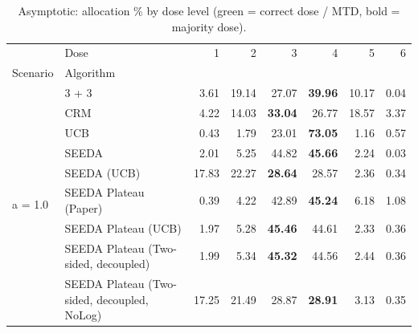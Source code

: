 \begin{table}[H]
\centering
\caption{Asymptotic: allocation \% by dose level (green = correct dose / MTD, bold = majority dose).}
\label{tab:asym_alloc_by_dose}
\begin{tabular}{llrrrrrr}
\toprule
 & Dose & 1 & 2 & 3 & 4 & 5 & 6 \\
Scenario & Algorithm &  &  &  &  &  &  \\
\midrule
\multirow[c]{9}{*}{a = 1.0} & 3 + 3 & 3.61 & 19.14 & {\cellcolor[HTML]{C8E6C9}} 27.07 & \bfseries 39.96 & 10.17 & 0.04 \\
 & CRM & 4.22 & 14.03 & {\cellcolor[HTML]{C8E6C9}} \bfseries 33.04 & 26.77 & 18.57 & 3.37 \\
 & UCB & 0.43 & 1.79 & {\cellcolor[HTML]{C8E6C9}} 23.01 & \bfseries 73.05 & 1.16 & 0.57 \\
 & SEEDA & 2.01 & 5.25 & {\cellcolor[HTML]{C8E6C9}} 44.82 & \bfseries 45.66 & 2.24 & 0.03 \\
 & SEEDA (UCB) & 17.83 & 22.27 & {\cellcolor[HTML]{C8E6C9}} \bfseries 28.64 & 28.57 & 2.36 & 0.34 \\
 & SEEDA Plateau (Paper) & 0.39 & 4.22 & {\cellcolor[HTML]{C8E6C9}} 42.89 & \bfseries 45.24 & 6.18 & 1.08 \\
 & SEEDA Plateau (UCB) & 1.97 & 5.28 & {\cellcolor[HTML]{C8E6C9}} \bfseries 45.46 & 44.61 & 2.33 & 0.36 \\
 & SEEDA Plateau (Two-sided, decoupled) & 1.99 & 5.34 & {\cellcolor[HTML]{C8E6C9}} \bfseries 45.32 & 44.56 & 2.44 & 0.36 \\
 & SEEDA Plateau (Two-sided, decoupled, NoLog) & 17.25 & 21.49 & {\cellcolor[HTML]{C8E6C9}} 28.87 & \bfseries 28.91 & 3.13 & 0.35 \\
\bottomrule
\end{tabular}
\end{table}
